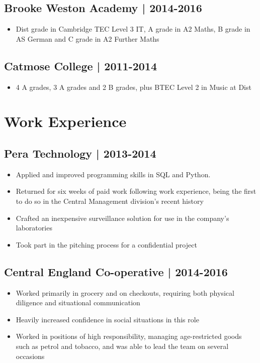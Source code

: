 \documentclass{article}
\begin{document}
\subsection*{Brooke Weston Academy | 2014-2016}
\begin{itemize}
	\item Dist\* grade in Cambridge TEC Level 3 IT, A grade in A2 Maths, B grade in AS German and C grade in A2 Further Maths
\end{itemize}
\subsection*{Catmose College | 2011-2014}
\begin{itemize}
	\item 4 A\* grades, 3 A grades and 2 B grades, plus BTEC Level 2 in Music at Dist\*
\end{itemize}
\section*{Work Experience}
\subsection*{Pera Technology | 2013-2014}
\begin{itemize}
	\item Applied and improved programming skills in SQL and Python.
	\item Returned for six weeks of paid work following work experience, being the first to do so in the Central Management division's recent history
	\item Crafted an inexpensive surveillance solution for use in the company's laboratories
	\item Took part in the pitching process for a confidential project
\end{itemize}
\subsection*{Central England Co-operative | 2014-2016}
\begin{itemize}
	\item Worked primarily in grocery and on checkouts, requiring both physical diligence and situational communication
	\item Heavily increased confidence in social situations in this role
	\item Worked in positions of high responsibility, managing age-restricted goods such as petrol and tobacco, and was able to lead the team on several occasions
\end{itemize}
\end{document}
